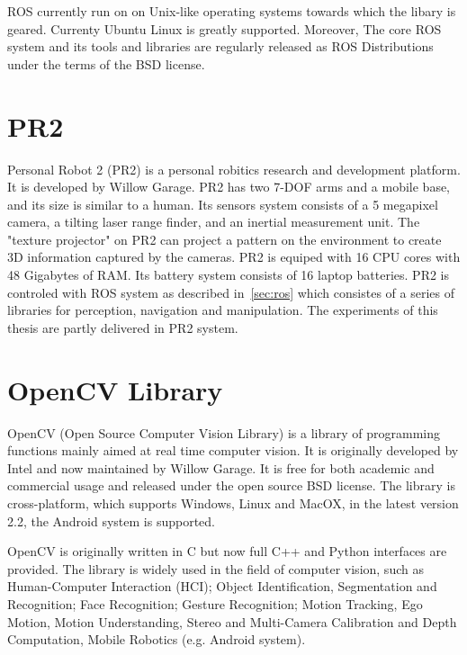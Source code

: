 ROS currently run on on Unix-like operating systems towards which the libary is
geared. Currenty Ubuntu Linux is greatly supported. Moreover, The core
ROS system and its tools and libraries are regularly released as ROS
Distributions~\cite{rosintroduction} under the terms of the BSD license.

\section{PR2}
\label{sec:pr2}
Personal Robot 2 (PR2) is a personal robitics research and development
platform.  It is developed by Willow Garage.  PR2 has two 7-DOF arms and a mobile
base, and its size  is similar to a human. Its sensors system consists of a 5
megapixel camera, a tilting laser range finder, and an inertial
measurement unit. The "texture projector" on PR2 can project a pattern
on the environment to create 3D information captured by the
cameras. PR2 is equiped with 16 CPU cores with 48 Gigabytes of
RAM. Its battery system consists of 16 laptop batteries. PR2 is
controled with ROS system as described  in~\ref{sec:ros} which
consistes of a series of libraries for perception, navigation and
manipulation.
The experiments of this thesis are partly delivered in PR2 system.

\section{OpenCV Library}
\label{sec:opencv}

OpenCV (Open Source Computer Vision Library) is a library of
programming functions mainly aimed at real time computer vision. It is
originally developed by Intel and now maintained by Willow Garage. It
is free for both academic and commercial usage and released  under the
open source BSD license. The library is cross-platform, which supports
Windows, Linux and MacOX,  in the latest version 2.2, the Android
system is supported.

OpenCV is originally written in C but now full C++ and Python
interfaces are provided. The library is widely used in the field of
computer vision, such as Human-Computer Interaction (HCI); Object
Identification, Segmentation and Recognition; Face Recognition;
Gesture Recognition; Motion Tracking, Ego Motion, Motion
Understanding, Stereo and Multi-Camera
Calibration and Depth Computation, Mobile Robotics (e.g. Android
system).

